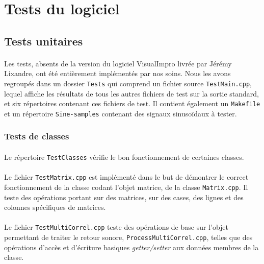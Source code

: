 \section{Tests du logiciel}

\subsection{Tests unitaires}

\paragraph{}
Les tests, absents de la version du logiciel VisualImpro livrée par
Jérémy Lixandre, ont été entièrement implémentés par nos soins. Nous
les avons regroupés dans un dossier \verb!Tests! qui comprend un
fichier source \verb!TestMain.cpp!, lequel affiche les résultats de
tous les autres fichiers de test sur la sortie standard, et six
répertoires contenant ces fichiers de test. Il contient également un
\verb!Makefile! et un répertoire \verb!Sine-samples! contenant des
signaux sinusoïdaux à tester.

\subsubsection{Tests de classes}
\paragraph{}
Le répertoire \verb!TestClasses! vérifie le bon fonctionnement de
certaines classes.

\paragraph{}
Le fichier \verb!TestMatrix.cpp! est implémenté dans le but de
démontrer le correct fonctionnement de la classe codant l'objet
matrice, de la classe \verb!Matrix.cpp!. Il teste des opérations
portant sur des matrices, sur des cases, des lignes et des colonnes
spécifiques de matrices.

\paragraph{}
Le fichier \verb!TestMultiCorrel.cpp! teste des opérations de base sur
l'objet permettant de traiter le retour sonore,
\verb!ProcessMultiCorrel.cpp!, telles que des opérations d'accès et
d'écriture basiques \textit{getter/setter} aux données membres de la
classe.


